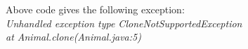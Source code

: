 Above code gives the following exception:\\
\textit{
	Unhandled exception type CloneNotSupportedException\\
	at Animal.clone(Animal.java:5)
}